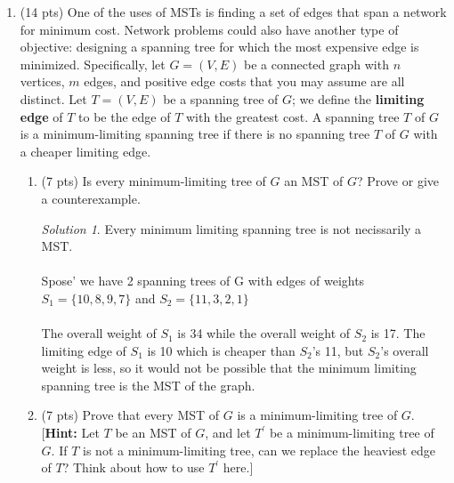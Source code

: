 \documentclass[12pt]{article}
\theoremstyle{remark}
\newtheorem*{solution}{Solution}
\begin{document}
\begin{enumerate}
\pagebreak
\item (14 pts) One of the uses of MSTs is finding a set of edges that span a network for minimum cost. Network problems could also have another type of objective: designing a spanning tree for which the most expensive edge is minimized. Specifically, let $G = (V, E)$ be a connected graph with $n$ vertices, $m$ edges, and positive edge costs that you may assume are all distinct. Let $T = (V, E)$ be a spanning tree of $G$; we define the \textbf{limiting edge} of $T$ to be the edge of $T$ with the greatest cost.
A spanning tree $T$ of $G$ is a minimum-limiting spanning tree if there is no spanning tree $T$ of $G$ with a cheaper limiting edge.
\begin{enumerate}
\item (7 pts) Is every minimum-limiting tree of $G$ an MST of $G$? Prove or give a counterexample.
\begin{solution}
Every minimum limiting spanning tree is not necissarily a MST. \\ \\ Spose' we have 2 spanning trees of G with edges of weights $S_1 = \{10,8,9,7\}$ and $S_2 = \{11,3,2,1\}$ \\ \\ The overall weight of $S_1$ is 34 while the overall weight of $S_2$ is 17. The limiting edge of $S_1$ is 10 which is cheaper than $S_2$'s 11, but $S_2$'s overall weight is less, so it would not be possible that the minimum limiting spanning tree is the MST of the graph.
\end{solution}

\pagebreak
\item (7 pts) Prove that every MST of $G$ is a minimum-limiting tree of $G$. [\textbf{Hint:} Let $T$ be an MST of $G$, and let $T^{\prime}$ be a minimum-limiting tree of $G$. If $T$ is not a minimum-limiting tree, can we replace the heaviest edge of $T$? Think about how to use $T^{\prime}$ here.]


\end{enumerate}
\end{enumerate}
\end{document}
